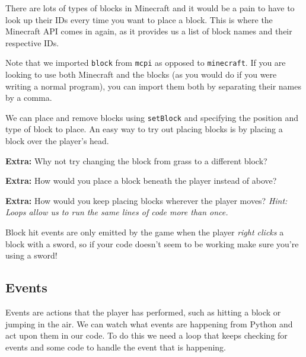 		There are lots of types of blocks in Minecraft and it would be a pain to have to look up their IDs every time you want to place a block. This is where the Minecraft API comes in again, as it provides us a list of block names and their respective IDs.

		

		Note that we imported \texttt{block} from \texttt{mcpi} as opposed to \texttt{minecraft}. If you are looking to use both Minecraft and the blocks (as you would do if you were writing a normal program), you can import them both by separating their names by a comma.

		

		We can place and remove blocks using \texttt{setBlock} and specifying the position and type of block to place. An easy way to try out placing blocks is by placing a block over the player's head.

		

		\textbf{Extra:} Why not try changing the block from grass to a different block?

		\textbf{Extra:} How would you place a block beneath the player instead of above?

		\textbf{Extra:} How would you keep placing blocks wherever the player moves? \textit{Hint: Loops allow us to run the same lines of code more than once.}

		\begin{aside}
			Block hit events are only emitted by the game when the player \textit{right clicks} a block with a sword, so if your code doesn't seem to be working make sure you're using a sword!
		\end{aside}

	\subsection{Events}

		Events are actions that the player has performed, such as hitting a block or jumping in the air. We can watch what events are happening from Python and act upon them in our code. To do this we need a loop that keeps checking for events and some code to handle the event that is happening.

